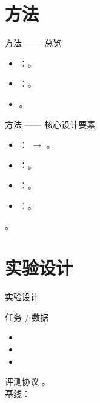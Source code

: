 {%
\renewcommand{\secblurb}{\ph{本节一句话主旨：方法的核心思想与组成}}
\section{方法}

\begin{frame}{方法 —— 总览}
  \begin{itemize}
    \item {}：。
    \item {}：。
    \item {}。
  \end{itemize}
\end{frame}


\begin{frame}{方法 —— 核心设计要素}
  \begin{itemize}
    \item {}： $\to$ 。
    \item {}：。
    \item {}：。
    \item {}：。
  \end{itemize}
  \tightgap
  \begin{callout}[要点]
    。
  \end{callout}
\end{frame}

\renewcommand{\secblurb}{\ph{本节一句话主旨：任务范围与评测协议}}
\section{实验设计}

\begin{frame}{实验设计}
  \begin{block}{任务 / 数据}
    \begin{itemize}
      \setlength{\itemsep}{0.3em}
      \item {}
      \item {}
      \item {}
    \end{itemize}
  \end{block}
  \tightgap
  \begin{exampleblock}{评测协议}
    \small {}。\\[0.15em]
    {\footnotesize\color{sustechgrey} 基线：}
  \end{exampleblock}
\end{frame}

}
